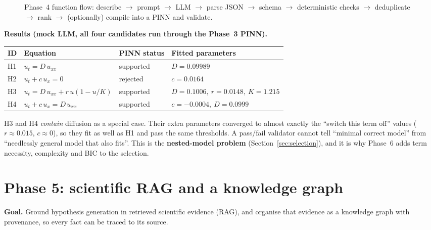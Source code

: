\begin{figure}[!htb]
\centering

\pkglegend
\caption{Phase~4 function flow: describe $\to$ prompt $\to$ LLM $\to$ parse JSON $\to$ schema $\to$ deterministic
checks $\to$ deduplicate $\to$ rank $\to$ (optionally) compile into a PINN and validate.}
\label{fig:p4}
\end{figure}

\textbf{Results (mock LLM, all four candidates run through the Phase~3 PINN).}
\begin{center}
\small
\begin{tabular}{@{}llll@{}}
\toprule
\textbf{ID} & \textbf{Equation} & \textbf{PINN status} & \textbf{Fitted parameters} \\ \midrule
H1 & $u_t = D\,u_{xx}$ & supported & $D=0.09989$ \\
H2 & $u_t + c\,u_x = 0$ & rejected & $c=0.0164$ \\
H3 & $u_t = D\,u_{xx} + r\,u(1-u/K)$ & supported & $D=0.1006,\ r=0.0148,\ K=1.215$ \\
H4 & $u_t + c\,u_x = D\,u_{xx}$ & supported & $c=-0.0004,\ D=0.0999$ \\
\bottomrule
\end{tabular}
\end{center}

\begin{lesson}
H3 and H4 \emph{contain} diffusion as a special case. Their extra parameters converged to almost exactly the
``switch this term off'' values ($r\approx0.015$, $c\approx0$), so they fit as well as H1 and pass the same
thresholds. A pass/fail validator cannot tell ``minimal correct model'' from ``needlessly general model that
also fits''. This is the \textbf{nested-model problem} (Section~\ref{sec:selection}), and it is why Phase~6 adds
term necessity, complexity and BIC to the selection.
\end{lesson}

\section{Phase 5: scientific RAG and a knowledge graph}\label{sec:p5}

\textbf{Goal.} Ground hypothesis generation in retrieved scientific evidence (RAG), and organise that evidence as
a knowledge graph with provenance, so every fact can be traced to its source.

